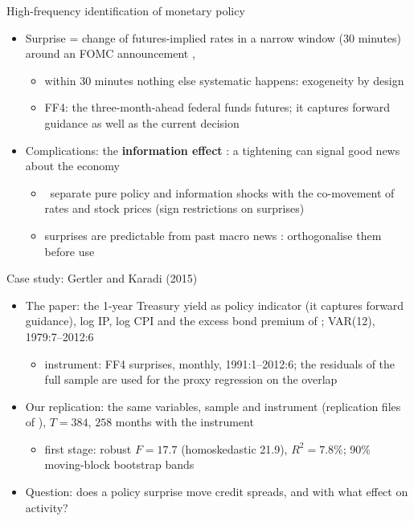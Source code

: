 \begin{frame}{High-frequency identification of monetary policy}
\itemsize{\small}
\begin{itemize}
    \item Surprise = change of futures-implied rates in a narrow window (30 minutes) around an FOMC announcement , 
    \begin{itemize}
        \item within 30 minutes nothing else systematic happens: exogeneity by design
        \item FF4: the three-month-ahead federal funds futures; it captures forward guidance as well as the current decision 
    \end{itemize}
    \item Complications: the \textbf{information effect} : a tightening can signal good news about the economy
    \begin{itemize}
        \item {}\ separate pure policy and information shocks with the co-movement of rates and stock prices (sign restrictions on surprises)
        \item surprises are predictable from past macro news : orthogonalise them before use
    \end{itemize}
\end{itemize}
\end{frame}

\begin{frame}{Case study: Gertler and Karadi (2015)}
\itemsize{\small}
\begin{itemize}
    \item The paper: the 1-year Treasury yield as policy indicator (it captures forward guidance), log IP, log CPI and the excess bond premium of ; VAR(12), 1979:7--2012:6 
    \begin{itemize}
        \item instrument: FF4 surprises, monthly, 1991:1--2012:6; the residuals of the full sample are used for the proxy regression on the overlap
    \end{itemize}
    \item Our replication: the same variables, sample and instrument (replication files of ), $T = 384$, $258$ months with the instrument
    \begin{itemize}
        \item first stage: robust $F = 17.7$ (homoskedastic 21.9), $R^2 = 7.8\%$; 90\% moving-block bootstrap bands 
    \end{itemize}
    \item Question: does a policy surprise move credit spreads, and with what effect on activity?
\end{itemize}
\end{frame}

